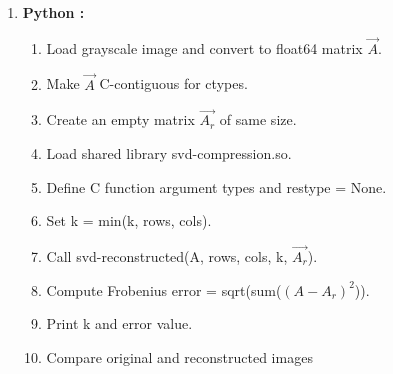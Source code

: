\documentclass[journal,12pt,onecolumn]{IEEEtran}
\theoremstyle{remark}
\begin{document}
\begin{justify}
\begin{enumerate}
6. Reconstruct A-recon = $\vec{U}\vec{S}\vec{V^T}$\\
      For each pixel position (b, d):\\
          A-recon[b, d] = sum over $i= 0 \rightarrow k-1$ of\\
                           $\vec{U[bi]} \vec{S[i]} \vec{V[di]}$ \\
7. Free all allocated memory\\
\item \textbf{Python :}
\begin{enumerate}
\item  Load grayscale image and convert to float64 matrix $\vec{A}$.
\item  Make $\vec{A}$ C-contiguous for ctypes.
\item  Create an empty matrix $\vec{A_r}$ of same size.
\item  Load shared library svd-compression.so.
\item  Define C function argument types and restype = None.
\item  Set k = min(k, rows, cols).
\item Call svd-reconstructed(A, rows, cols, k, $\vec{A_r}$).
\item  Compute Frobenius error = sqrt(sum($({A} - {A_r})^2$)).
\item  Print k and error value.
\item  Compare original and reconstructed images

\end{enumerate}
    \end{enumerate}
\end{justify}

\newpage
\end{document}
